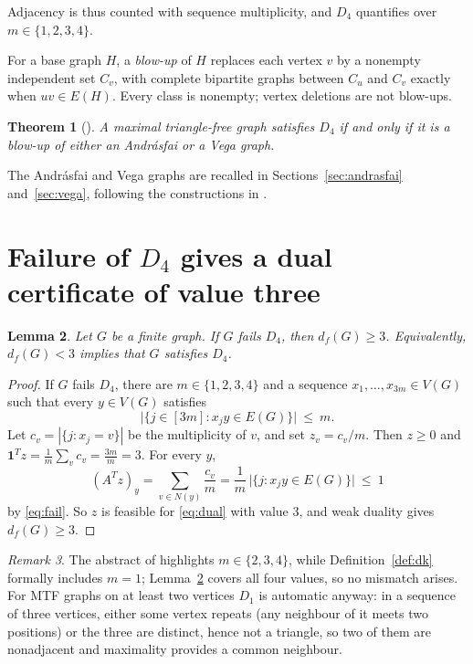 \documentclass[11pt]{article}
\newtheorem{theorem}{Theorem}[section]
\newtheorem{lemma}[theorem]{Lemma}
\theoremstyle{definition}
\theoremstyle{remark}
\newtheorem{remark}[theorem]{Remark}
\newcommand{\df}{d_f}
\newcommand{\ones}{\mathbf 1}
\begin{document}
Adjacency is thus counted with sequence multiplicity, and $D_4$ quantifies over
$m\in\{1,2,3,4\}$.

For a base graph $H$, a \emph{blow-up} of $H$ replaces each vertex $v$ by a nonempty
independent set $C_v$, with complete bipartite graphs between $C_u$ and $C_v$ exactly when
$uv\in E(H)$. Every class is nonempty; vertex deletions are not blow-ups.

\begin{theorem}[{\cite[Theorem~1.2]{LPR}}]\label{thm:lpr}
A maximal triangle-free graph satisfies $D_4$ if and only if it is a blow-up of either an
Andr\'asfai or a Vega graph.
\end{theorem}

The Andr\'asfai and Vega graphs are recalled in Sections~\ref{sec:andrasfai}
and~\ref{sec:vega}, following the constructions in \cite{LPR}.

\section{Failure of $D_4$ gives a dual certificate of value three}

\begin{lemma}\label{lem:duality}
Let $G$ be a finite graph. If $G$ fails $D_4$, then $\df(G)\ge3$. Equivalently,
$\df(G)<3$ implies that $G$ satisfies $D_4$.
\end{lemma}

\begin{proof}
If $G$ fails $D_4$, there are $m\in\{1,2,3,4\}$ and a sequence $x_1,\dots,x_{3m}\in V(G)$
such that every $y\in V(G)$ satisfies
\begin{equation}\label{eq:fail}
\bigl|\{j\in[3m] : x_jy\in E(G)\}\bigr|\ \le\ m .
\end{equation}
Let $c_v=|\{j : x_j=v\}|$ be the multiplicity of $v$, and set $z_v=c_v/m$. Then $z\ge0$ and
$\ones^Tz=\tfrac1m\sum_v c_v=\tfrac{3m}m=3$. For every $y$,
\[
(A^Tz)_y=\sum_{v\in N(y)}\frac{c_v}{m}
=\frac1m\,\bigl|\{j : x_jy\in E(G)\}\bigr|\ \le\ 1
\]
by \eqref{eq:fail}. So $z$ is feasible for \eqref{eq:dual} with value $3$, and weak duality
gives $\df(G)\ge3$.
\end{proof}

\begin{remark}\label{rem:m1}
The abstract of \cite{LPR} highlights $m\in\{2,3,4\}$, while Definition~\ref{def:dk} formally
includes $m=1$; Lemma~\ref{lem:duality} covers all four values, so no mismatch arises. For
MTF graphs on at least two vertices $D_1$ is automatic anyway: in a sequence of three
vertices, either some vertex repeats (any neighbour of it meets two positions) or the three
are distinct, hence not a triangle, so two of them are nonadjacent and maximality provides a
common neighbour.
\end{remark}
\end{document}
